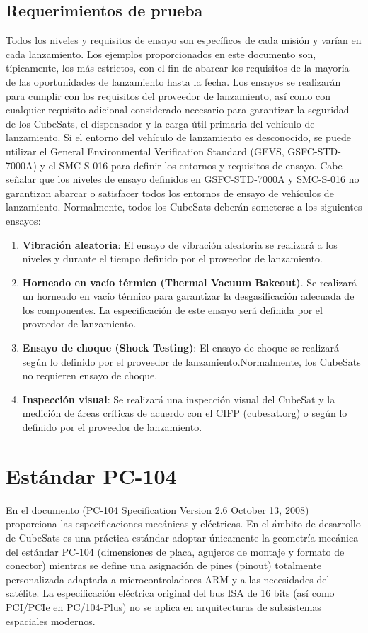 \documentclass[11pt,a4paper,twoside]{report}
\begin{document}
	\subsection{Requerimientos de prueba}
	Todos los niveles y requisitos de ensayo son específicos de cada misión y varían en cada lanzamiento. Los ejemplos proporcionados en este documento son, típicamente, los más estrictos, con el fin de abarcar los requisitos de la mayoría de las oportunidades de lanzamiento hasta la fecha. Los ensayos se realizarán para cumplir con los requisitos del proveedor de lanzamiento, así como con cualquier requisito adicional considerado necesario para garantizar la seguridad de los CubeSats, el dispensador y la carga útil primaria del vehículo de lanzamiento. Si el entorno del vehículo de lanzamiento es desconocido, se puede utilizar el General Environmental Verification Standard (GEVS, GSFC-STD-7000A) y el SMC-S-016 para definir los entornos y requisitos de ensayo. Cabe señalar que los niveles de ensayo definidos en GSFC-STD-7000A y SMC-S-016 no garantizan abarcar o satisfacer todos los entornos de ensayo de vehículos de lanzamiento. Normalmente, todos los CubeSats deberán someterse a los siguientes ensayos:
	\begin{enumerate}
		\item \textbf{Vibración aleatoria}: El ensayo de vibración aleatoria se realizará a los niveles y durante el tiempo definido por el proveedor de lanzamiento.
		
		\item \textbf{Horneado en vacío térmico (Thermal Vacuum Bakeout)}. Se realizará un horneado en vacío térmico para garantizar la desgasificación adecuada de los componentes. La especificación de este ensayo será definida por el proveedor de lanzamiento.
		
		\item \textbf{Ensayo de choque (Shock Testing)}: El ensayo de choque se realizará según lo definido por el proveedor de lanzamiento.Normalmente, los CubeSats no requieren ensayo de choque.
		
		\item \textbf{Inspección visual}: Se realizará una inspección visual del CubeSat y la medición de áreas críticas de acuerdo con el CIFP (cubesat.org) o según lo definido por el proveedor de lanzamiento.
	\end{enumerate}
	
	\section{Estándar PC-104}
	En el documento (PC-104 Specification Version 2.6 October 13, 2008) proporciona las especificaciones mecánicas y eléctricas. En el ámbito de desarrollo de CubeSats es una práctica estándar adoptar únicamente la geometría mecánica del estándar PC-104 (dimensiones de placa, agujeros de montaje y formato de conector) mientras se define una asignación de pines (pinout) totalmente personalizada adaptada a microcontroladores ARM y a las necesidades del satélite. La especificación eléctrica original del bus ISA de 16 bits (así como PCI/PCIe en PC/104-Plus) no se aplica en arquitecturas de subsistemas espaciales modernos.
	
\end{document}
